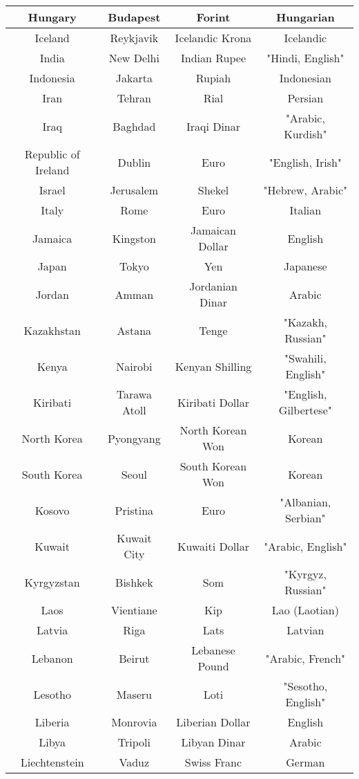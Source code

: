 \documentclass{article}
\begin{document}
\begin{center}
\begin{tabular} {||  c c c c  ||}
Hungary & Budapest & Forint & Hungarian   \\ \hline 
Iceland & Reykjavik & Icelandic Krona & Icelandic   \\ \hline 
India & New Delhi & Indian Rupee & "Hindi, English"   \\ \hline 
Indonesia & Jakarta & Rupiah & Indonesian   \\ \hline 
Iran & Tehran & Rial & Persian   \\ \hline 
Iraq & Baghdad & Iraqi Dinar & "Arabic, Kurdish"   \\ \hline 
Republic of Ireland & Dublin & Euro & "English, Irish"   \\ \hline 
Israel & Jerusalem & Shekel & "Hebrew, Arabic"   \\ \hline 
Italy & Rome & Euro & Italian   \\ \hline 
Jamaica & Kingston & Jamaican Dollar & English   \\ \hline 
Japan & Tokyo & Yen & Japanese   \\ \hline 
Jordan & Amman & Jordanian Dinar & Arabic   \\ \hline 
Kazakhstan & Astana & Tenge & "Kazakh, Russian"   \\ \hline 
Kenya & Nairobi & Kenyan Shilling & "Swahili, English"   \\ \hline 
Kiribati & Tarawa Atoll & Kiribati Dollar & "English, Gilbertese"   \\ \hline 
North Korea & Pyongyang & North Korean Won & Korean   \\ \hline 
South Korea & Seoul & South Korean Won & Korean   \\ \hline 
Kosovo & Pristina & Euro & "Albanian, Serbian"   \\ \hline 
Kuwait & Kuwait City & Kuwaiti Dollar & "Arabic, English"   \\ \hline 
Kyrgyzstan & Bishkek & Som & "Kyrgyz, Russian"   \\ \hline 
Laos & Vientiane & Kip & Lao (Laotian)   \\ \hline 
Latvia & Riga & Lats & Latvian   \\ \hline 
Lebanon & Beirut & Lebanese Pound & "Arabic, French"   \\ \hline 
Lesotho & Maseru & Loti & "Sesotho, English"   \\ \hline 
Liberia & Monrovia & Liberian Dollar & English   \\ \hline 
Libya & Tripoli & Libyan Dinar & Arabic   \\ \hline 
Liechtenstein & Vaduz & Swiss Franc & German   \\ \hline 

\end{tabular}
\end{center}
\end{document}
